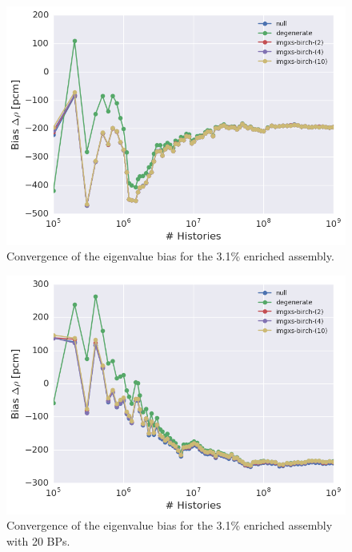 \begin{figure}[h!]
\centering
\includegraphics[width=0.88\linewidth]{figures/results/convergence/assm-31/keff-bias-evo}
\vspace{2mm}
\caption[Eigenvalue bias covergence for a 3.1\% enriched assembly]{Convergence of the eigenvalue bias for the 3.1\% enriched assembly.}
\label{fig:chap11-assm-3.1-eigenvalue-converge}
\end{figure}

\begin{figure}[h!]
\centering
\includegraphics[width=0.88\linewidth]{figures/results/convergence/assm-31-20BPs/keff-bias-evo}
\vspace{2mm}
\caption[Eigenvalue bias covergence for a 3.1\% enriched assembly with 20 \acp{BP}]{Convergence of the eigenvalue bias for the 3.1\% enriched assembly with 20 \acp{BP}.}
\label{fig:chap11-assm-3.1-20BPs-eigenvalue-converge}
\end{figure}

